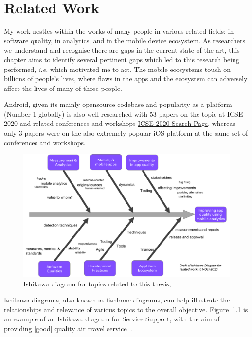 \chapter{Related Work}
My work nestles within the works of many people in various related fields: in software quality, in analytics, and in the mobile device ecosystem. As researchers we understand and recognise there are gaps in the current state of the art, this chapter aims to identify several pertinent gaps which led to this research being performed, \emph{i.e.} which motivated me to act. The mobile ecosystems touch on billions of people's lives, where flaws in the apps and the ecosystem can adversely affect the lives of many of those people. 

Android, given its mainly opensource codebase and popularity as a platform (Number 1 globally) is also well researched with 53 papers on the topic at ICSE 2020 and related conferences and workshops \href{https://conferences.computer.org/icse/#!/search}{ICSE 2020 Search Page}, whereas only 3 papers were on the also extremely popular iOS platform at the same set of conferences and workshops.

\begin{figure}[htbp!]
    \centering
    \includegraphics[width=15cm]{images/related-works-ishikawa-diagram-01-oct-2020.png}
    \caption{Ishikawa diagram for topics related to this thesis, }
    \label{fig:related_works_ishikawa_diagram}
\end{figure}

Ishikawa diagrams, also known as fishbone diagrams, can help illustrate the relationships and relevance of various topics to the overall objective. Figure~\ref{fig:related_works_ishikawa_diagram} is an example of an Ishikawa diagram for Service Support, with the aim of providing [good] quality air travel service~\cite{itil_ishikawa_example}. 

